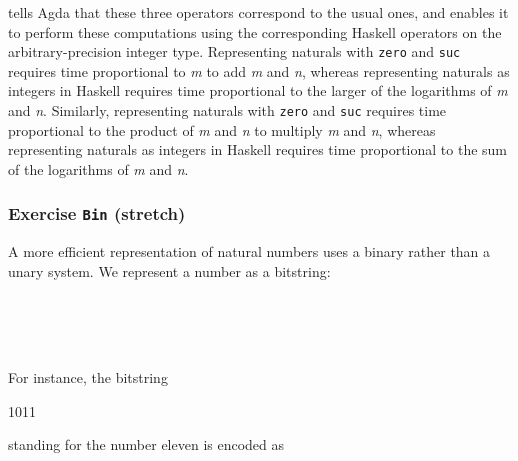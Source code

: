 tells Agda that these three operators correspond to the usual ones, and
enables it to perform these computations using the corresponding Haskell
operators on the arbitrary-precision integer type. Representing naturals
with \texttt{zero} and \texttt{suc} requires time proportional to
\emph{m} to add \emph{m} and \emph{n}, whereas representing naturals as
integers in Haskell requires time proportional to the larger of the
logarithms of \emph{m} and \emph{n}. Similarly, representing naturals
with \texttt{zero} and \texttt{suc} requires time proportional to the
product of \emph{m} and \emph{n} to multiply \emph{m} and \emph{n},
whereas representing naturals as integers in Haskell requires time
proportional to the sum of the logarithms of \emph{m} and \emph{n}.

\hypertarget{Naturals-Bin}{%
\subsubsection{\texorpdfstring{Exercise \texttt{Bin}
(stretch)}{Exercise Bin (stretch)}}\label{Naturals-Bin}}

A more efficient representation of natural numbers uses a binary rather
than a unary system. We represent a number as a bitstring:

\begin{fence}
\begin{code}%
\>[0]\AgdaSpace{}%
\AgdaSpace{}%
\AgdaSymbol{:}\AgdaSpace{}%
\AgdaSpace{}%
\<%
\\
\>[0][@{}l@{\AgdaIndent{0}}]%
\>[2]\AgdaSpace{}%
\AgdaSymbol{:}\AgdaSpace{}%
\<%
\\
%
\>[2]\AgdaSpace{}%
\AgdaSymbol{:}\AgdaSpace{}%
\AgdaSpace{}%
\AgdaSpace{}%
\<%
\\
%
\>[2]\AgdaSpace{}%
\AgdaSymbol{:}\AgdaSpace{}%
\AgdaSpace{}%
\AgdaSpace{}%
\<%
\end{code}
\end{fence}

For instance, the bitstring

\begin{myDisplay}
1011
\end{myDisplay}

standing for the number eleven is encoded as

